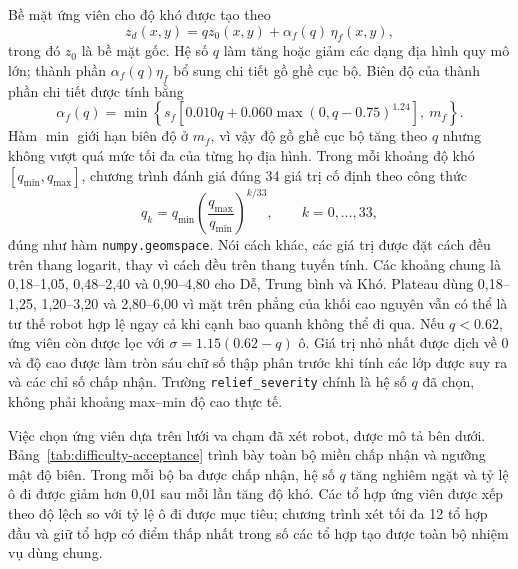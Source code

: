 \documentclass[11pt]{article}
\begin{document}
Bề mặt ứng viên cho độ khó được tạo theo
\begin{equation}
  z_d(x,y)=q z_0(x,y)+\alpha_f(q)\,\eta_f(x,y),
\end{equation}
trong đó $z_0$ là bề mặt gốc. Hệ số $q$ làm tăng hoặc giảm các dạng địa hình
quy mô lớn; thành phần $\alpha_f(q)\eta_f$ bổ sung chi tiết gồ ghề cục bộ.
Biên độ của thành phần chi tiết được tính bằng
\begin{equation}
  \alpha_f(q)=\min\!\left\{s_f\left[0.010q+
  0.060\max(0,q-0.75)^{1.24}\right],\ m_f\right\}.
\end{equation}
Hàm $\min$ giới hạn biên độ ở $m_f$, vì vậy độ gồ ghề cục bộ tăng theo $q$
nhưng không vượt quá mức tối đa của từng họ địa hình.
Trong mỗi khoảng độ khó $[q_{\min},q_{\max}]$, chương trình đánh giá đúng 34
giá trị cố định theo công thức
\begin{equation}
  q_k=q_{\min}\left(\frac{q_{\max}}{q_{\min}}\right)^{k/33},
  \qquad k=0,\ldots,33,
\end{equation}
đúng như hàm \texttt{numpy.geomspace}. Nói cách khác, các giá trị được đặt cách
đều trên thang logarit, thay vì cách đều trên thang tuyến tính. Các khoảng chung là
0,18--1,05, 0,48--2,40 và 0,90--4,80 cho Dễ, Trung bình và
Khó. Plateau dùng 0,18--1,25, 1,20--3,20 và 2,80--6,00 vì mặt trên phẳng của
khối cao nguyên vẫn có thể là tư thế robot hợp lệ ngay cả khi cạnh bao quanh không thể đi
qua. Nếu $q<0.62$, ứng viên còn được lọc với $\sigma=1.15(0.62-q)$ ô. Giá trị
nhỏ nhất được dịch về 0 và độ cao được làm tròn sáu chữ số thập phân trước khi
tính các lớp được suy ra và các chỉ số chấp nhận. Trường
\texttt{relief\_severity} chính là hệ số $q$ đã chọn, không phải khoảng
max--min độ cao thực tế.

Việc chọn ứng viên dựa trên lưới va chạm đã xét robot, được mô tả bên dưới.
Bảng~\ref{tab:difficulty-acceptance} trình bày toàn bộ miền chấp nhận và ngưỡng
mật độ biên. Trong mỗi bộ ba được chấp nhận, hệ số $q$ tăng nghiêm ngặt và tỷ
lệ ô đi được giảm hơn 0,01 sau mỗi lần tăng độ khó. Các tổ hợp ứng viên được xếp
theo độ lệch so với tỷ lệ ô đi được mục tiêu; chương trình xét tối đa 12 tổ hợp đầu và giữ tổ hợp có
điểm thấp nhất trong số các tổ hợp tạo được toàn bộ nhiệm vụ dùng chung.
\end{document}
